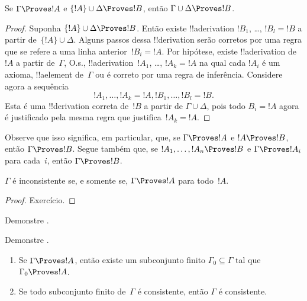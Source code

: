 \documentclass[../../../include/open-logic-section]{subfiles}
\begin{document}
\begin{prop}[Transitividade]
Se $\Gamma \Proves !A$ e $\{!A\} \cup \Delta \Proves
!B$, então $\Gamma \cup \Delta \Proves !B$.
\end{prop}

\begin{proof}
  Suponha $\{!A\} \cup \Delta \Proves !B$. Então existe
  !!a{derivation} $!B_1$, \dots, $!B_l = !B$ a partir de~$\{!A\} \cup
  \Delta$. Alguns passos dessa !!{derivation} serão corretos por uma
  regra que se refere a uma linha anterior~$!B_i = !A$. Por hipótese,
  existe !!a{derivation} de~$!A$ a partir de~$\Gamma$, O.s.\@,
  !!a{derivation}~$!A_1$, \dots, $!A_k = !A$ na qual cada $!A_i$ é um
  axioma, !!a{element} de~$\Gamma$ ou é correto por uma regra de
  inferência. Considere agora a sequência
  \[
  !A_1, \dots, !A_k = !A, !B_1, \dots, !B_l = !B.
  \]
  Esta é uma !!{derivation} correta de~$!B$ a partir de $\Gamma \cup
  \Delta$, pois todo $B_i = !A$ agora é justificado pela mesma regra
  que justifica~$!A_k = !A$.
\end{proof}

Observe que isso significa, em particular, que, se $\Gamma \Proves !A$
e $!A \Proves !B$, então $\Gamma \Proves !B$. Segue também que, se
$!A_1, \dots, !A_n \Proves !B$ e $\Gamma \Proves !A_i$ para cada~$i$,
então $\Gamma \Proves !B$.

\begin{prop}
$\Gamma$ é inconsistente se, e somente se, $\Gamma \Proves !A$ para todo~$!A$.
\end{prop}

\begin{proof}
Exercício.
\end{proof}

\begin{prob}
Demonstre .
\end{prob}
\tagendprob

\begin{prob}
Demonstre .
\end{prob}
\tagendprob

\begin{prop}[Compacidade]
  \begin{enumerate}
  \item Se $\Gamma \Proves !A$, então existe um subconjunto finito $\Gamma_0
    \subseteq \Gamma$ tal que $\Gamma_0 \Proves !A$.
  \item Se todo subconjunto finito de~$\Gamma$ é
    consistente, então $\Gamma$ é consistente.
  \end{enumerate}
\end{prop}
\end{document}
